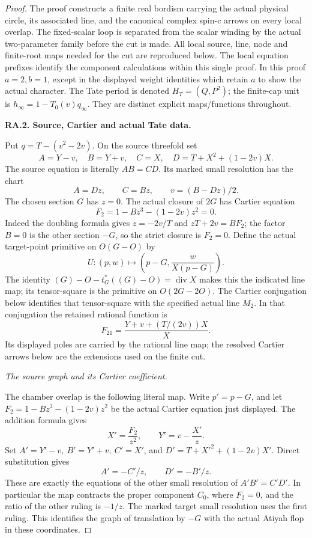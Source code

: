 \begin{proof}
The proof constructs a finite real bordism carrying the
actual physical circle, its associated line, and the
canonical complex spin-c arrows on every local overlap.
The fixed-scalar loop is separated from the scalar winding
by the actual two-parameter family before the cut is made.
All local source, line, node and finite-root maps needed
for the cut are reproduced below. The local equation
prefixes identify the component calculations within this
single proof. In this proof \(a=2,b=1\), except in the
displayed weight identities which retain \(a\) to show
the actual character. The Tate period is denoted
\(H_T=(Q,P^2)\); the finite-cap unit is
\(h_\infty=1-T_0(v)q_\infty\). They are distinct
explicit maps/functions throughout.

\par\medskip\noindent\textbf{RA.2. Source, Cartier and actual Tate data.}\par\nopagebreak[4]

Put \(q=T-(v^2-2v)\).  On the source threefold set
\[
 A=Y-v,\quad B=Y+v,\quad C=X,\quad
 D=T+X^2+(1-2v)X .
\]
The source equation is literally \(AB=CD\).  Its marked small
resolution has the chart
\[
 A=Dz,\qquad C=Bz,\qquad v=(B-Dz)/2.
\]
The chosen section \(G\) has \(z=0\).  The actual closure of
\(2G\) has Cartier equation
\[
 F_2=1-Bz^3-(1-2v)z^2=0.
\]
Indeed the doubling formula gives \(z=-2v/T\) and
\(zT+2v=BF_2\); the factor \(B=0\) is the other section
\(-G\), so the strict closure is \(F_2=0\).
Define the actual target-point primitive on \(O(G-O)\) by
\[
 U:(p,w)\longmapsto\left(p-G,\frac{w}{X(p-G)}\right).
 \tag{P3K.80.SZ.7}
\]
The identity
\((G)-O-t_G^*((G)-O)=\operatorname{div}X\)
makes this the indicated line map; its tensor-square is the
primitive on \(O(2G-2O)\).  The Cartier conjugation below
identifies that tensor-square with the specified actual
line \(M_2\).  In that conjugation the retained rational
function is
\[
 F_{21}=\frac{Y+v+(T/(2v))X}{X}.
\]
Its displayed poles are carried by the rational line map;
the resolved Cartier arrows below are the extensions used
on the finite cut.


\par\smallskip\noindent\textit{The source graph and its Cartier coefficient.}\par\nopagebreak[4]

The chamber overlap is the following literal map.
Write \(p'=p-G\), and let \(F_2=1-Bz^3-(1-2v)z^2\) be the actual
Cartier equation just displayed. The addition formula gives
\[
 X'=\frac{F_2}{z^2},\qquad Y'=v-\frac{X'}z.
\]
Set \(A'=Y'-v,\ B'=Y'+v,\ C'=X'\), and
\(D'=T+X'^2+(1-2v)X'\). Direct substitution gives
\[
                   A'=-C'/z,\qquad D'=-B'/z.                \tag{P3K.80.SZ.14}
\]
These are exactly the equations of the other small resolution of
\(A'B'=C'D'\). In particular the map contracts the proper component
\(C_0\), where \(F_2=0\), and the ratio of the other ruling is
\(-1/z\). The marked target small resolution uses the first ruling.
This identifies the graph of translation by \(-G\) with the actual
Atiyah flop in these coordinates.


\end{proof}
